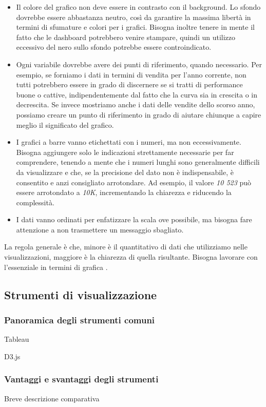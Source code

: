 \begin{itemize}
    \item Il colore del grafico non deve essere in contrasto con il background.
    Lo sfondo dovrebbe essere abbastanza neutro, così da garantire la massima libertà in termini di sfumature e colori per i grafici. Bisogna inoltre tenere in mente il fatto che le dashboard potrebbero venire stampare, quindi un utilizzo eccessivo del nero sullo sfondo potrebbe essere controindicato.
    \item Ogni variabile dovrebbe avere dei punti di riferimento, quando necessario.
    Per esempio, se forniamo i dati in termini di vendita per l'anno corrente, non tutti potrebbero essere in grado di discernere se si tratti di performance buone o cattive, indipendentemente dal fatto che la curva sia in crescita o in decrescita. Se invece mostriamo anche i dati delle vendite dello scorso anno, possiamo creare un punto di riferimento in grado di aiutare chiunque a capire meglio il significato del grafico.
    \item I grafici a barre vanno etichettati con i numeri, ma non eccessivamente.
    Bisogna aggiungere solo le indicazioni strettamente necessarie per far comprendere, tenendo a mente che i numeri lunghi sono generalmente difficili da visualizzare e che, se la precisione del dato non è indispensabile, è consentito e anzi consigliato arrotondare. Ad esempio, il valore \textit{10 523} può essere arrotondato a \textit{10K}, incrementando la chiarezza e riducendo la complessità.
    \item I dati vanno ordinati per enfatizzare la scala ove possibile, ma bisogna fare attenzione a non trasmettere un messaggio sbagliato.
\end{itemize}
La regola generale è che, minore è il quantitativo di dati che utilizziamo nelle visualizzazioni, maggiore è la chiarezza di quella risultante. Bisogna lavorare con l'essenziale in termini di grafica \cite{DataVisualization_Caratteristiche}.

\subsection{Strumenti di visualizzazione}
\subsubsection{Panoramica degli strumenti comuni}
Tableau

D3.js

\subsubsection{Vantaggi e svantaggi degli strumenti}
Breve descrizione comparativa

